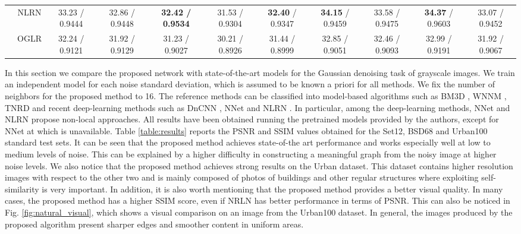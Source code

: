 \documentclass[journal]{IEEEtran}
\begin{document}
\begin{table*}[t]
\begin{tabular}{ccccccccccc}
                    & NLRN     & 33.23 / 0.9444          & 32.86 / 0.9448          & \textbf{32.42 / 0.9534} & 31.53 / 0.9304          & \textbf{32.40} / 0.9347 & \textbf{34.15} / 0.9459 & 33.58 / 0.9475          & \textbf{34.37} / 0.9603  & 33.07 / 0.9452          \\ 
                    & OGLR     & 32.24 / 0.9121          & 31.92 / 0.9129          & 31.23 / 0.9027          & 30.21 / 0.8926          & 31.44 / 0.8999          & 32.85 / 0.9051          & 32.46 / 0.9093          & 32.99 / 0.9191               & 31.92 / 0.9067          \\ \hline
\end{tabular}
\label{table:depthmap}
\end{table*}

In this section we compare the proposed network with state-of-the-art models for the Gaussian denoising task of grayscale images. We train an independent model for each noise standard deviation, which is assumed to be known a priori for all methods. We fix the number of neighbors for the proposed method to 16. The reference methods can be classified into model-based algorithms such as BM3D \cite{dabov2007image}, WNNM \cite{gu2014weighted}, TNRD \cite{chen2016trainable} and recent deep-learning methods such as DnCNN \cite{zhang2017beyond}, NNet \cite{plotz2018neural} and NLRN \cite{liu2018non}. In particular, among the deep-learning methods, NNet and NLRN propose non-local approaches. All results have been obtained running the pretrained models provided by the authors, except for NNet at  which is unavailable. Table \ref{table:results} reports the PSNR and SSIM values obtained for the Set12, BSD68 and Urban100 standard test sets. It can be seen that the proposed method achieves state-of-the art performance and works especially well at low to medium levels of noise. This can be explained by a higher difficulty in constructing a meaningful graph from the noisy image at higher noise levels. We also notice that the proposed method achieves strong results on the Urban dataset. This dataset contains higher resolution images with respect to the other two and is mainly composed of photos of buildings and other regular structures where exploiting self-similarity is very important. In addition, it is also worth mentioning that the proposed method provides a better visual quality. In many cases, the proposed method has a higher SSIM score, even if NRLN has better performance in terms of PSNR. This can also be noticed in Fig. \ref{fig:natural_visual}, which shows a visual comparison on an image from the Urban100 dataset. In general, the images produced by the proposed algorithm present sharper edges and smoother content in uniform areas.
\end{document}
